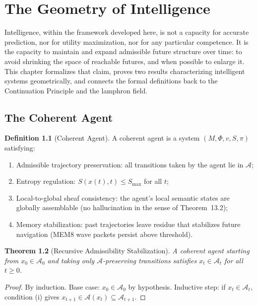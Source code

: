 \documentclass[12pt, oneside]{book}
\theoremstyle{flyxion}
\newtheorem{theorem}{Theorem}[chapter]
\theoremstyle{definition}
\newtheorem{definition}[theorem]{Definition}
\begin{document}
\chapter{The Geometry of Intelligence}

Intelligence, within the framework developed here, is
not a capacity for accurate prediction, nor for utility
maximization, nor for any particular competence. It is
the capacity to maintain and expand admissible future
structure over time: to avoid shrinking the space of
reachable futures, and when possible to enlarge it.
This chapter formalizes that claim, proves two results
characterizing intelligent systems geometrically, and
connects the formal definitions back to the Continuation
Principle and the lamphron field.

\section{The Coherent Agent}

\begin{definition}[Coherent Agent]
A coherent agent is a system $(M, \Phi, v, S, \pi)$
satisfying:
\begin{enumerate}
\item[(i)] Admissible trajectory preservation: all
   transitions taken by the agent lie in $\mathcal{A}$;
\item[(ii)] Entropy regulation: $S(x(t), t) \leq
   S_\mathrm{max}$ for all $t$;
\item[(iii)] Local-to-global sheaf consistency: the
   agent's local semantic states are globally assemblable
   (no hallucination in the sense of
   Theorem~13.2);
\item[(iv)] Memory stabilization: past trajectories
   leave residue that stabilizes future navigation
   (MEM\textbar{}8 wave packets persist above threshold).
\end{enumerate}
\end{definition}

\begin{theorem}[Recursive Admissibility Stabilization]
A coherent agent starting from $x_0 \in \mathcal{A}_0$
and taking only $\mathcal{A}$-preserving transitions
satisfies $x_t \in \mathcal{A}_t$ for all $t \geq 0$.
\end{theorem}

\begin{proof}
By induction. Base case: $x_0 \in \mathcal{A}_0$ by
hypothesis. Inductive step: if $x_t \in \mathcal{A}_t$,
condition (i) gives $x_{t+1} \in \mathcal{A}(x_t)
\subseteq \mathcal{A}_{t+1}$.
\end{proof}
\end{document}
